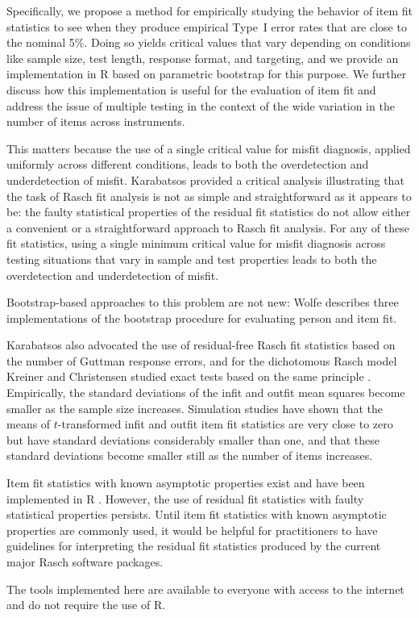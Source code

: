 \documentclass[11pt,a4paper]{article}
\begin{document}
Specifically, we propose a method for empirically studying the behavior of item fit statistics to see when they produce empirical Type~I error rates that are close to the nominal 5\%. Doing so yields critical values that vary depending on conditions like sample size, test length, response format, and targeting, and we provide an implementation in R based on parametric bootstrap for this purpose. We further discuss how this implementation is useful for the evaluation of item fit and address the issue of multiple testing in the context of the wide variation in the number of items across instruments.

This matters because the use of a single critical value for misfit diagnosis, applied uniformly across different conditions, leads to both the overdetection and underdetection of misfit. Karabatsos \cite{Karabatsos-2000} provided a critical analysis illustrating that the task of Rasch fit analysis is not as simple and straightforward as it appears to be: the faulty statistical properties of the residual fit statistics do not allow either a convenient or a straightforward approach to Rasch fit analysis. For any of these fit statistics, using a single minimum critical value for misfit diagnosis across testing situations that vary in sample and test properties leads to both the overdetection and underdetection of misfit.

Bootstrap-based approaches to this problem are not new: Wolfe \citeyear{Wolfe-2013} describes three implementations of the bootstrap procedure for evaluating person and item fit. 

Karabatsos also advocated the use of residual-free Rasch fit statistics based on the number of Guttman response errors, and for the dichotomous Rasch model Kreiner and Christensen studied exact tests based on the same principle . Empirically, the standard deviations of the infit and outfit mean squares become smaller as the sample size increases. Simulation studies have shown that the means of $t$-transformed infit and outfit item fit statistics are very close to zero but have standard deviations considerably smaller than one, and that these standard deviations become smaller still as the number of items increases.

Item fit statistics with known asymptotic properties \cite{Christensen-Kreiner-2013,Muller-2020,Johansson2025} exist and have been implemented in R \cite{iarm}. However, the use of residual fit statistics with faulty statistical properties persists. Until item fit statistics with known asymptotic properties are commonly used, it would be helpful for practitioners to have guidelines for interpreting the residual fit statistics produced by the current major Rasch software packages.

The tools implemented here are available to everyone with access to the internet and do not require the use of R.



\end{document}
